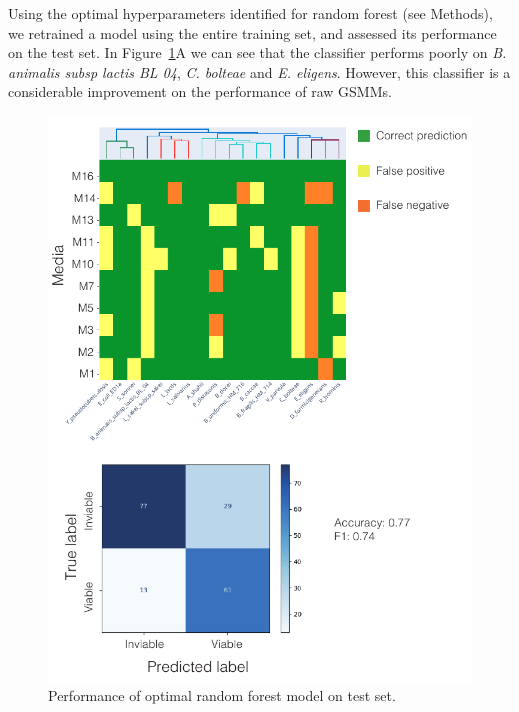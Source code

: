 \documentclass[11pt,a4paper]{article}
\begin{document}
Using the optimal hyperparameters identified for random forest (see Methods), we retrained a model using the entire training set, and assessed its performance on the test set. In Figure~\ref{fig:FIG_test_set}A we can see that the classifier performs poorly on \textit{B. animalis subsp lactis BL 04}, \textit{C. bolteae} and \textit{E. eligens}. However, this classifier is a considerable improvement on the performance of raw GSMMs.  
\begin{figure}[tbp]
    \includegraphics[width=\textwidth]{figures/FIG_test_set/FIG_test_set.pdf}
    \caption{Performance of optimal random forest model on test set.}
    \label{fig:FIG_test_set}
\end{figure}
\end{document}
